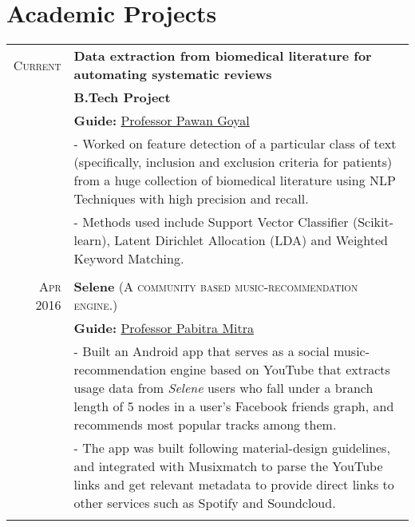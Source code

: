 \documentclass[a4paper,10pt]{extarticle} %
\begin{document}

\section{Academic Projects}

\begin{tabular}{r|p{16cm}}

\textsc{Current} & \textbf{Data extraction from biomedical literature for automating systematic reviews} \\
& \textbf{B.Tech Project}\\
& \textbf{Guide: }\textmd{\href{http://cse.iitkgp.ac.in/~pawang/}{Professor Pawan Goyal}}\\
& \footnotesize{- Worked on feature detection of a particular class of text (specifically, inclusion and exclusion criteria for patients) from a huge collection of biomedical literature using NLP Techniques with high precision and recall.}\\
& \footnotesize{- Methods used include Support Vector Classifier (Scikit-learn), Latent Dirichlet Allocation (LDA) and Weighted Keyword Matching.}\\
\multicolumn{2}{c}{} \\

\textsc{Apr 2016} & \textbf{Selene} \textsc{(A community based music-recommendation engine.)} \\
& \textbf{Guide: }\textmd{\href{http://cse.iitkgp.ac.in/~pabitra/}{Professor Pabitra Mitra}}\\
& \footnotesize{- Built an Android app that serves as a social music-recommendation engine based on YouTube that extracts usage data from {\itshape{Selene}} users who fall under a branch length of 5 nodes in a user's Facebook friends graph, and recommends most popular tracks among them.}\\
& \footnotesize{- The app was built following material-design guidelines, and integrated with Musixmatch to parse the YouTube links and get relevant metadata to provide direct links to other services such as Spotify and Soundcloud.}\\
\multicolumn{2}{c}{} \\

\end{tabular}
\end{document}
